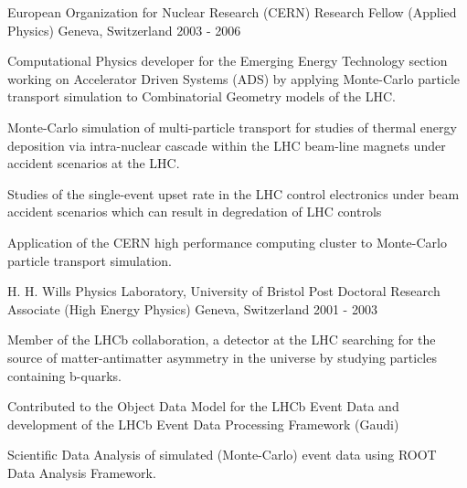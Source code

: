\begin{cventries}
\cventry
{European Organization for Nuclear Research (CERN)} %
{Research Fellow (Applied Physics)} %
{Geneva, Switzerland} %
{2003 - 2006} %
{
  \begin{cvitems} %
    \item {
        Computational Physics developer for the Emerging Energy Technology section 
        working on Accelerator Driven Systems (ADS) by applying Monte-Carlo particle 
        transport simulation to Combinatorial Geometry models of the LHC.}
    \item {
        Monte-Carlo simulation of multi-particle transport for studies of thermal 
        energy deposition via intra-nuclear cascade within the LHC beam-line magnets 
        under accident scenarios at the LHC.
    \item {
        Studies of the single-event upset rate in the LHC control electronics under 
        beam accident scenarios which can result in degredation of LHC controls}
    \item {
        Application of the CERN high performance computing cluster to Monte-Carlo 
        particle transport simulation.}
    }
  \end{cvitems}
}

\cventry
{H. H. Wills Physics Laboratory, University of Bristol} %
{Post Doctoral Research Associate (High Energy Physics)} %
{Geneva, Switzerland} %
{2001 - 2003} %
{
  \begin{cvitems} %
    \item {
        Member of the LHCb collaboration, a detector at the LHC searching for the source of
        matter-antimatter asymmetry in the universe by studying particles containing b-quarks.}
    \item {
        Contributed to the Object Data Model for the LHCb Event Data and development of the 
        LHCb Event Data Processing Framework (Gaudi)}
    \item {
        Scientific Data Analysis of simulated (Monte-Carlo) event data using ROOT Data Analysis Framework.
        }
  \end{cvitems}
}


\end{cventries}
